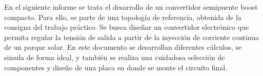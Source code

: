 \documentclass[
	spanish, %
	letterpaper, oneside
]{article}
\begin{document}
\templatePortrait

\templatePagecfg

\begin{abstractd}
	En el siguiente informe se trata el desarrollo de un convertidor semipuente boost compacto. Para ello, se parte de una topología de referencia, obtenida de la consigna del trabajo práctico. Se busca diseñar un convertidor electrónico que permita regular la tensión de salida a partir de la inyección de corriente continua de un parque solar. En este documento se desarrollan diferentes cálculos, se simula de forma ideal, y también se realiza una cuidadosa selección de componentes y diseño de una placa en donde se monte el circuito final.
\end{abstractd}

\templateIndex

\templateFinalcfg



\end{document}
